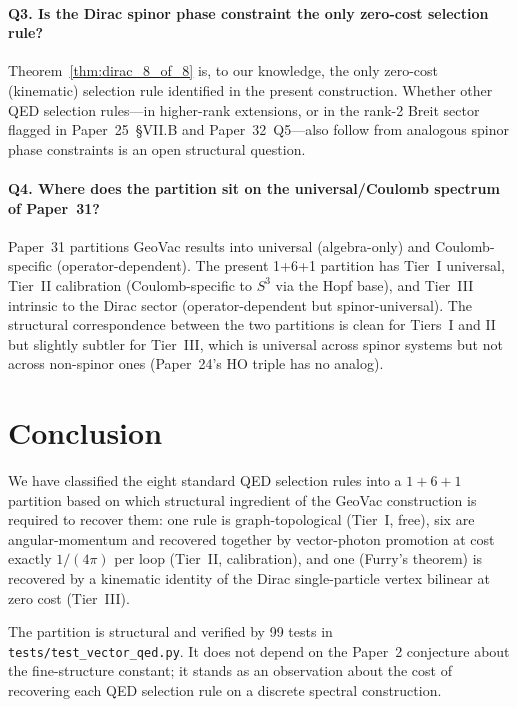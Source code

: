 \documentclass[11pt]{article}
\begin{document}
\paragraph{Q3.  Is the Dirac spinor phase constraint the only
zero-cost selection rule?}  Theorem~\ref{thm:dirac_8_of_8} is, to
our knowledge, the only zero-cost (kinematic) selection rule
identified in the present construction.  Whether other QED
selection rules---in higher-rank extensions, or in the rank-2 Breit
sector flagged in Paper~25~\S VII.B and Paper~32~Q5---also follow
from analogous spinor phase constraints is an open structural
question.

\paragraph{Q4.  Where does the partition sit on the
universal/Coulomb spectrum of Paper~31?}  Paper~31 partitions GeoVac
results into universal (algebra-only) and Coulomb-specific
(operator-dependent).  The present 1+6+1 partition has Tier~I
universal, Tier~II calibration (Coulomb-specific to $S^3$ via the
Hopf base), and Tier~III intrinsic to the Dirac sector
(operator-dependent but spinor-universal).  The structural
correspondence between the two partitions is clean for Tiers~I and
II but slightly subtler for Tier~III, which is universal across
spinor systems but not across non-spinor ones (Paper~24's HO triple
has no analog).

\section{Conclusion}
\label{sec:conclusion}

We have classified the eight standard QED selection rules into a
$1{+}6{+}1$ partition based on which structural ingredient of the
GeoVac construction is required to recover them: one rule is
graph-topological (Tier~I, free), six are angular-momentum and
recovered together by vector-photon promotion at cost exactly
$1/(4\pi)$ per loop (Tier~II, calibration), and one (Furry's theorem)
is recovered by a kinematic identity of the Dirac single-particle
vertex bilinear at zero cost (Tier~III).

The partition is structural and verified by 99 tests in
\texttt{tests/test\_vector\_qed.py}.  It does not depend on the
Paper~2 conjecture about the fine-structure constant; it stands as an
observation about the cost of recovering each QED selection rule on a
discrete spectral construction.
\end{document}
